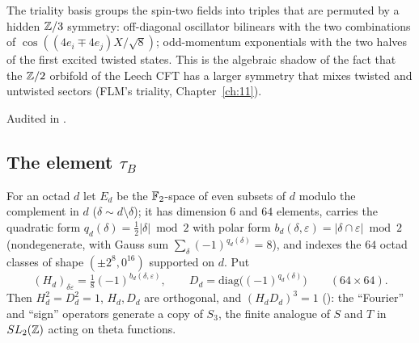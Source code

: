 \begin{physics}
The triality basis groups the spin-two fields into triples that are permuted by a hidden ${\mathbb{Z}}/3$
symmetry: off-diagonal oscillator bilinears with the two combinations of $\cos((4e_i\mp4e_j)X/\sqrt8)$;
odd-momentum exponentials with the two halves of the first excited twisted states.  This is the
algebraic shadow of the fact that the ${\mathbb{Z}}/2$ orbifold of the Leech CFT has a larger symmetry that mixes
twisted and untwisted sectors (FLM's triality, Chapter~\ref{ch:11}).
\end{physics}
\begin{status}
Audited in .
\end{status}

\subsection{The element \texorpdfstring{$\tau_B$}{tauB}}

For an octad $d$ let $E_d$ be the $\mathbb{F}_2$-space of even subsets of $d$ modulo the complement in $d$
($\delta\sim d\setminus\delta$); it has dimension $6$ and $64$ elements, carries the quadratic form
$q_d(\delta)=\tfrac12|\delta|\bmod2$ with polar form $b_d(\delta,\varepsilon)=|\delta\cap\varepsilon|\bmod2$
(nondegenerate, with Gauss sum $\sum_\delta(-1)^{q_d(\delta)}=8$), and indexes the $64$ octad classes of
shape $(\pm2^8,0^{16})$ supported on $d$.  Put
\begin{equation*}
  (H_d)_{\delta\varepsilon}=\tfrac18(-1)^{b_d(\delta,\varepsilon)},\qquad
  D_d=\mathrm{diag}\bigl((-1)^{q_d(\delta)}\bigr)\qquad(64\times64).
\end{equation*}
Then $H_d^2=D_d^2=1$, $H_d,D_d$ are orthogonal, and $(H_dD_d)^3=1$ ():
the ``Fourier'' and ``sign'' operators generate a copy of $S_3$, the finite analogue of $S$ and $T$ in
$SL_2({\mathbb{Z}})$ acting on theta functions.

